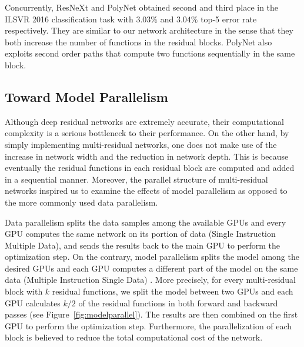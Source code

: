 \documentclass[journal]{IEEEtran}
\begin{document}
Concurrently, ResNeXt \cite{xie2016aggregated} and PolyNet \cite{zhang2016polynet} obtained  second and third place in the ILSVR 2016 classification task with $3.03\%$ and $3.04\%$ top-5 error rate respectively. They are similar to our network architecture in the sense that they both increase the number of functions in the residual blocks. PolyNet also exploits second order paths that compute two functions sequentially in the same block.



\subsection{Toward Model Parallelism}
Although deep residual networks are extremely accurate, their computational complexity is a serious bottleneck to their performance. On the other hand, by simply implementing multi-residual networks, one does not make use of the increase in network width and the reduction in network depth. This is because eventually the residual functions in each residual block are computed and added in a sequential manner. Moreover, the parallel structure of multi-residual networks inspired us to examine the effects of model parallelism as opposed to the more commonly used data parallelism.

Data parallelism splits the data samples among the available GPUs and every GPU computes the same network on its portion of data (Single Instruction Multiple Data), and sends the results back to the main GPU to perform the optimization step. On the contrary, model parallelism splits the model among the desired GPUs and each GPU computes a different part of the model on the same data (Multiple Instruction Single Data)  \cite{dean2012large,krizhevsky2014one}. More precisely, for every multi-residual block with $k$ residual functions, we split the model between two GPUs and each GPU calculates $k/2$ of the residual functions in both forward and backward passes (see Figure~\ref{fig:modelparallel}). The results are then combined on the first GPU to perform the optimization step. Furthermore, the parallelization of each block is believed to reduce the total computational cost of the network. 
\end{document}
